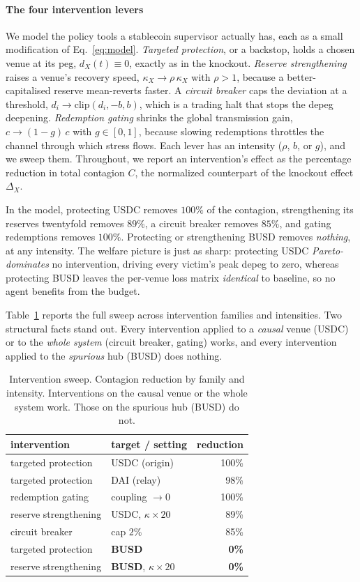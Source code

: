 \documentclass[sigconf,anonymous]{acmart}
\begin{document}
\paragraph{The four intervention levers} We model the policy tools a stablecoin supervisor actually
has, each as a small modification of Eq.~\eqref{eq:model}. \emph{Targeted protection}, or a backstop,
holds a chosen venue at its peg, $d_X(t)\equiv 0$, exactly as in the knockout. \emph{Reserve
strengthening} raises a venue's recovery speed, $\kappa_X\to\rho\,\kappa_X$ with $\rho>1$, because a
better-capitalised reserve mean-reverts faster. A \emph{circuit breaker} caps the deviation at a
threshold, $d_i\to\mathrm{clip}(d_i,-b,b)$, which is a trading halt that stops the depeg deepening.
\emph{Redemption gating} shrinks the global transmission gain, $c\to(1-g)\,c$ with $g\in[0,1]$,
because slowing redemptions throttles the channel through which stress flows. Each lever has an
intensity ($\rho$, $b$, or $g$), and we sweep them. Throughout, we report an intervention's
effect as the percentage reduction in total contagion $C$, the normalized counterpart of the
knockout effect $\Delta_X$.

In the model, protecting USDC removes $100\%$ of the contagion, strengthening its reserves
twentyfold removes $89\%$, a circuit breaker removes $85\%$, and gating
redemptions removes $100\%$. Protecting or strengthening BUSD removes \emph{nothing}, at any
intensity. The welfare picture is just as sharp: protecting USDC \emph{Pareto-dominates} no
intervention, driving every victim's peak depeg to zero, whereas protecting BUSD leaves the
per-venue loss matrix \emph{identical} to baseline, so no agent benefits from the budget.

Table~\ref{tab:interventions} reports the full sweep across intervention families and intensities.
Two structural facts stand out. Every intervention applied to a \emph{causal} venue (USDC) or to the
\emph{whole system} (circuit breaker, gating) works, and every intervention applied to the
\emph{spurious} hub (BUSD) does nothing.

\begin{table}[t]
\caption{Intervention sweep. Contagion reduction by family and intensity. Interventions on the causal
venue or the whole system work. Those on the spurious hub (BUSD) do not.}
\label{tab:interventions}
\small
\begin{tabular}{llr}
\toprule
intervention & target / setting & reduction \\
\midrule
targeted protection & USDC (origin) & 100\% \\
targeted protection & DAI (relay) & 98\% \\
redemption gating & coupling $\to 0$ & 100\% \\
reserve strengthening & USDC, $\kappa\times20$ & 89\% \\
circuit breaker & cap $2\%$ & 85\% \\
targeted protection & \textbf{BUSD} & \textbf{0\%} \\
reserve strengthening & \textbf{BUSD}, $\kappa\times20$ & \textbf{0\%} \\
\bottomrule
\end{tabular}
\end{table}
\end{document}
